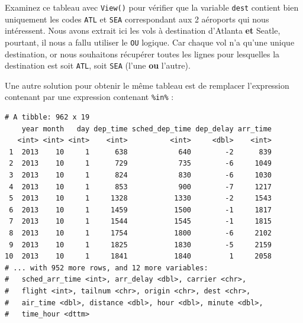 \documentclass[a4paperpaper,]{article}
\newenvironment{Shaded}{\begin{snugshade}}{\end{snugshade}}
\newcommand{\DecValTok}[1]{\textcolor[rgb]{0.69,0.50,0.00}{#1}}
\newcommand{\KeywordTok}[1]{\textcolor[rgb]{0.12,0.11,0.11}{\textbf{#1}}}
\newcommand{\NormalTok}[1]{\textcolor[rgb]{0.12,0.11,0.11}{#1}}
\newcommand{\OperatorTok}[1]{\textcolor[rgb]{0.12,0.11,0.11}{#1}}
\newcommand{\StringTok}[1]{\textcolor[rgb]{0.75,0.01,0.01}{#1}}
\begin{document}
Examinez ce tableau avec \texttt{View()} pour vérifier que la variable \texttt{dest} contient bien uniquement les codes \texttt{ATL} et \texttt{SEA} correspondant aux 2 aéroports qui nous intéressent. Nous avons extrait ici les vols à destination d'Atlanta \textbf{et} Seatle, pourtant, il nous a fallu utiliser le \texttt{OU} logique. Car chaque vol n'a qu'une unique destination, or nous souhaitons récupérer toutes les lignes pour lesquelles la destination est soit \texttt{ATL}, soit \texttt{SEA} (l'une \textbf{ou} l'autre).

Une autre solution pour obtenir le même tableau est de remplacer l'expression contenant \texttt{\textbar{}} par une expression contenant \texttt{\%in\%} :

\begin{Shaded}
\end{Shaded}

\begin{verbatim}
# A tibble: 962 x 19
    year month   day dep_time sched_dep_time dep_delay arr_time
   <int> <int> <int>    <int>          <int>     <dbl>    <int>
 1  2013    10     1      638            640        -2      839
 2  2013    10     1      729            735        -6     1049
 3  2013    10     1      824            830        -6     1030
 4  2013    10     1      853            900        -7     1217
 5  2013    10     1     1328           1330        -2     1543
 6  2013    10     1     1459           1500        -1     1817
 7  2013    10     1     1544           1545        -1     1815
 8  2013    10     1     1754           1800        -6     2102
 9  2013    10     1     1825           1830        -5     2159
10  2013    10     1     1841           1840         1     2058
# ... with 952 more rows, and 12 more variables:
#   sched_arr_time <int>, arr_delay <dbl>, carrier <chr>,
#   flight <int>, tailnum <chr>, origin <chr>, dest <chr>,
#   air_time <dbl>, distance <dbl>, hour <dbl>, minute <dbl>,
#   time_hour <dttm>
\end{verbatim}
\end{document}
